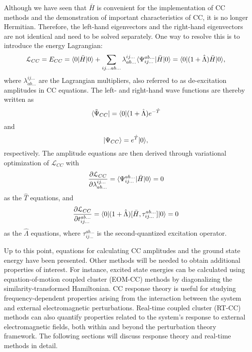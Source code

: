 Although we have seen that $\bar{H}$ is convenient for the implementation of CC methods and the demonstration of important characteristics of CC, it is no longer Hermitian. Therefore, the left-hand eigenvectors and the right-hand eigenvectors are not identical and need to be solved separately. One way to resolve this is to introduce the energy Lagrangian:\cite{Beavis1990, Koch1990} 
\begin{equation}
\mathcal{L}_{CC} = E_{CC} = \langle0 |\bar{H}| 0 \rangle + \sum_{ij...ab...}\lambda_{ab...}^{ij...}\langle\Psi_{ij...}^{ab...} |\bar{H}| 0 \rangle 
                                             = \langle0 |(1 + \hat{\Lambda})\bar{H}| 0 \rangle,
\label{eq:cc-lag}                                          
\end{equation}
where $\lambda_{ab...}^{ij...}$ are the Lagrangian multipliers, also referred to as de-excitation amplitudes in CC equations. The left- and right-hand wave functions are thereby written as
\begin{equation}
\langle\tilde{\Psi}_{CC} | = \langle0 |(1 + \hat{\Lambda})e^{-\hat{T}} 
\label{eq:cc-left-wfn}
\end{equation}
and
\begin{equation}
| \Psi_{CC} \rangle = e^{\hat{T}}| 0 \rangle,
\label{eq:cc-right-wfn}
\end{equation}
respectively. The amplitude equations are then derived through variational optimization of $\mathcal{L}_{CC}$ with
\begin{equation}
\frac{\partial \mathcal{L}_{CC}}{\partial \lambda_{ab...}^{ij...}} = \langle\Psi_{ij...}^{ab...} |\bar{H}| 0 \rangle = 0
\label{eq:cc-t-eqn}
\end{equation}
as the $\hat{T}$ equations, and 
\begin{equation}
\frac{\partial \mathcal{L}_{CC}}{\partial t_{ij...}^{ab...}} = \langle0 |(1 + \hat{\Lambda})[\bar{H}, \tau_{ij...}^{ab...}]| 0 \rangle = 0
\label{eq:cc-l-eqn}
\end{equation}
as the $\hat{\Lambda}$ equations, where $\tau_{ij...}^{ab...}$ is the second-quantized excitation operator.


Up to this point, equations for calculating CC amplitudes and the ground state energy have been presented. Other methods will be needed to obtain additional properties of interest. For instance, excited state energies can be calculated using equation-of-motion coupled cluster (EOM-CC) methods\cite{Geertsen1989, Stanton1993} by diagonalizing the similarity-transformed Hamiltonian. CC response theory\cite{Monkhorst1977, Dalgaard1983} is useful for studying frequency-dependent properties arising from the interaction between the system and external electromagnetic perturbations. Real-time coupled cluster (RT-CC) methods\cite{Schonhammer1978, Hoodbhoy1979} can also quantify properties related to the system's response to external electromagnetic fields, both within and beyond the perturbation theory framework. The following sections will discuss response theory and real-time methods in detail. 

